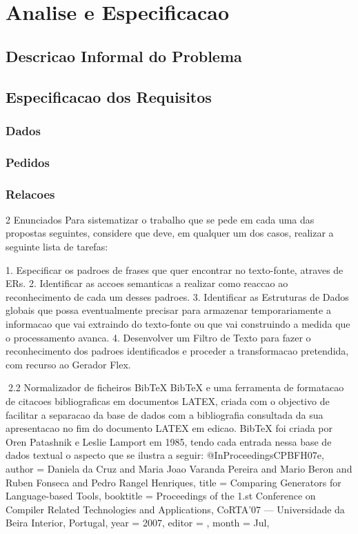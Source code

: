\chapter{Analise e Especificacao}
\label{ae}
\section{Descricao Informal do Problema}



\section{Especificacao dos Requisitos}

\subsection{Dados}

\subsection{Pedidos}

\subsection{Relacoes}



2     Enunciados
Para sistematizar o trabalho que se pede em cada uma das propostas seguintes, considere que deve, em qualquer um
dos casos, realizar a seguinte lista de tarefas:

    1. Especificar os padroes de frases que quer encontrar no texto-fonte, atraves de ERs.
    2. Identificar as accoes semanticas a realizar como reaccao ao reconhecimento de cada um desses padroes.
    3. Identificar as Estruturas de Dados globais que possa eventualmente precisar para armazenar temporariamente a
       informacao que vai extraindo do texto-fonte ou que vai construindo a medida que o processamento avanca.
    4. Desenvolver um Filtro de Texto para fazer o reconhecimento dos padroes identificados e proceder a transformacao
       pretendida, com recurso ao Gerador Flex.

2.2    Normalizador de ficheiros BibTeX
BibTeX e uma ferramenta de formatacao de citacoes bibliograficas em documentos LATEX, criada com o objectivo de
facilitar a separacao da base de dados com a bibliografia consultada da sua apresentacao no fim do documento LATEX
em edicao. BibTeX foi criada por Oren Patashnik e Leslie Lamport em 1985, tendo cada entrada nessa base de dados
textual o aspecto que se ilustra a seguir:
@InProceedings{CPBFH07e,
  author =    {Daniela da Cruz and Maria Joao Varanda Pereira
               and Mario Beron and Ruben Fonseca and
               Pedro Rangel Henriques},
  title =     {Comparing Generators for Language-based Tools},
  booktitle = {Proceedings of the 1.st Conference on Compiler
               Related Technologies and Applications, CoRTA'07
               --- Universidade da Beira Interior, Portugal},
  year =      {2007},
  editor =    {},
  month =     {Jul},
}

